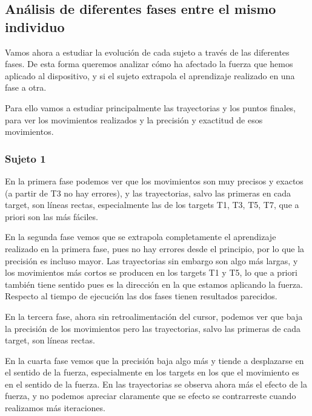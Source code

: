 \documentclass[a4paper,11pt, oneside]{book}
\begin{document}
\subsection{Análisis de diferentes fases entre el mismo individuo}

Vamos ahora a estudiar la evolución de cada sujeto a través de las diferentes fases. De esta forma queremos analizar cómo ha afectado la fuerza que hemos aplicado al dispositivo, y si el sujeto extrapola el aprendizaje realizado en una fase a otra.

Para ello vamos a estudiar principalmente las trayectorias y los puntos finales, para ver los movimientos realizados y la precisión y exactitud de esos movimientos.

\subsubsection{Sujeto 1}

En la primera fase podemos ver que los movimientos son muy precisos y exactos (a partir de T3 no hay errores), y las trayectorias, salvo las primeras en cada target, son líneas rectas, especialmente las de los targets T1, T3, T5, T7, que a priori son las más fáciles.

En la segunda fase vemos que se extrapola completamente el aprendizaje realizado en la primera fase, pues no hay errores desde el principio, por lo que la precisión es incluso mayor. Las trayectorias sin embargo son algo más largas, y los movimientos más cortos se producen en los targets T1 y T5, lo que a priori también tiene sentido pues es la dirección en la que estamos aplicando la fuerza. Respecto al tiempo de ejecución las dos fases tienen resultados parecidos.

En la tercera fase, ahora sin retroalimentación del cursor, podemos ver que baja la precisión de los movimientos pero las trayectorias, salvo las primeras de cada target, son líneas rectas.

En la cuarta fase vemos que la precisión baja algo más y tiende a desplazarse en el sentido de la fuerza, especialmente en los targets en los que el movimiento es en el sentido de la fuerza. En las trayectorias se observa ahora más el efecto de la fuerza, y no podemos apreciar claramente que se efecto se contrarreste cuando realizamos más iteraciones.
\end{document}
